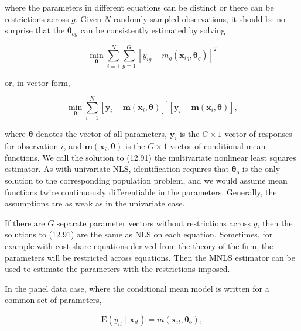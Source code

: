 \documentclass[10pt]{article}
\begin{document}
where the parameters in different equations can be distinct or there can be restrictions across $g$. Given $N$ randomly sampled observations, it should be no surprise that the $\boldsymbol{\theta}_{o g}$ can be consistently estimated by solving

$$
\min _{\boldsymbol{\theta}} \sum_{i=1}^{N} \sum_{g=1}^{G}\left[y_{i g}-m_{g}\left(\mathbf{x}_{i g}, \boldsymbol{\theta}_{g}\right)\right]^{2}
$$

or, in vector form,


\begin{equation*}
\min _{\boldsymbol{\theta}} \sum_{i=1}^{N}\left[\mathbf{y}_{i}-\mathbf{m}\left(\mathbf{x}_{i}, \boldsymbol{\theta}\right)\right]^{\prime}\left[\mathbf{y}_{i}-\mathbf{m}\left(\mathbf{x}_{i}, \boldsymbol{\theta}\right)\right], \tag{12.91}
\end{equation*}


where $\boldsymbol{\theta}$ denotes the vector of all parameters, $\mathbf{y}_{i}$ is the $G \times 1$ vector of responses for observation $i$, and $\mathbf{m}\left(\mathbf{x}_{i}, \boldsymbol{\theta}\right)$ is the $G \times 1$ vector of conditional mean functions. We call the solution to (12.91) the multivariate nonlinear least squares estimator. As with univariate NLS, identification requires that $\boldsymbol{\theta}_{\mathrm{o}}$ is the only solution to the corresponding population problem, and we would assume mean functions twice continuously differentiable in the parameters. Generally, the assumptions are as weak as in the univariate case.

If there are $G$ separate parameter vectors without restrictions across $g$, then the solutions to (12.91) are the same as NLS on each equation. Sometimes, for example with cost share equations derived from the theory of the firm, the parameters will be restricted across equations. Then the MNLS estimator can be used to estimate the parameters with the restrictions imposed.

In the panel data case, where the conditional mean model is written for a common set of parameters,


\begin{equation*}
\mathrm{E}\left(y_{i t} \mid \mathbf{x}_{i t}\right)=m\left(\mathbf{x}_{i t}, \boldsymbol{\theta}_{\mathrm{o}}\right), \tag{12.92}
\end{equation*}
\end{document}
